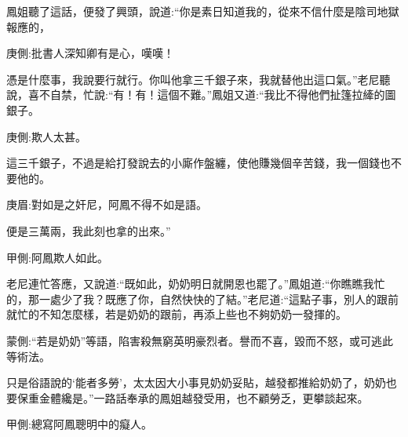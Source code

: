 \begin{parag}
    鳳姐聽了這話，便發了興頭，說道:“你是素日知道我的，從來不信什麼是陰司地獄報應的，\begin{note}庚側:批書人深知卿有是心，嘆嘆！\end{note}憑是什麼事，我說要行就行。你叫他拿三千銀子來，我就替他出這口氣。”老尼聽說，喜不自禁，忙說:“有！有！這個不難。”鳳姐又道:“我比不得他們扯篷拉縴的圖銀子。\begin{note}庚側:欺人太甚。\end{note}這三千銀子，不過是給打發說去的小廝作盤纏，使他賺幾個辛苦錢，我一個錢也不要他的。\begin{note}庚眉:對如是之奸尼，阿鳳不得不如是語。\end{note}便是三萬兩，我此刻也拿的出來。”\begin{note}甲側:阿鳳欺人如此。\end{note}老尼連忙答應，又說道:“既如此，奶奶明日就開恩也罷了。”鳳姐道:“你瞧瞧我忙的，那一處少了我？既應了你，自然快快的了結。”老尼道:“這點子事，別人的跟前就忙的不知怎麼樣，若是奶奶的跟前，再添上些也不夠奶奶一發揮的。\begin{note}蒙側:“若是奶奶”等語，陷害殺無窮英明豪烈者。譽而不喜，毀而不怒，或可逃此等術法。\end{note}只是俗語說的‘能者多勞’，太太因大小事見奶奶妥貼，越發都推給奶奶了，奶奶也要保重金體纔是。”一路話奉承的鳳姐越發受用，也不顧勞乏，更攀談起來。\begin{note}甲側:總寫阿鳳聰明中的癡人。\end{note}
\end{parag}


